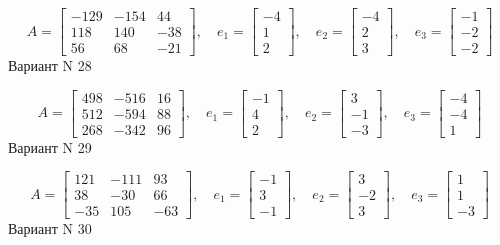 \documentclass[11pt]{report}
\begin{document}
$$A = \left[\begin{matrix}-129 & -154 & 44\\118 & 140 & -38\\56 & 68 & -21\end{matrix}\right],\quad e_1 = \left[\begin{matrix}-4\\1\\2\end{matrix}\right],\quad e_2 = \left[\begin{matrix}-4\\2\\3\end{matrix}\right],\quad e_3 = \left[\begin{matrix}-1\\-2\\-2\end{matrix}\right]$$Вариант N 28

$$A = \left[\begin{matrix}498 & -516 & 16\\512 & -594 & 88\\268 & -342 & 96\end{matrix}\right],\quad e_1 = \left[\begin{matrix}-1\\4\\2\end{matrix}\right],\quad e_2 = \left[\begin{matrix}3\\-1\\-3\end{matrix}\right],\quad e_3 = \left[\begin{matrix}-4\\-4\\1\end{matrix}\right]$$Вариант N 29

$$A = \left[\begin{matrix}121 & -111 & 93\\38 & -30 & 66\\-35 & 105 & -63\end{matrix}\right],\quad e_1 = \left[\begin{matrix}-1\\3\\-1\end{matrix}\right],\quad e_2 = \left[\begin{matrix}3\\-2\\3\end{matrix}\right],\quad e_3 = \left[\begin{matrix}1\\1\\-3\end{matrix}\right]$$Вариант N 30
\end{document}
